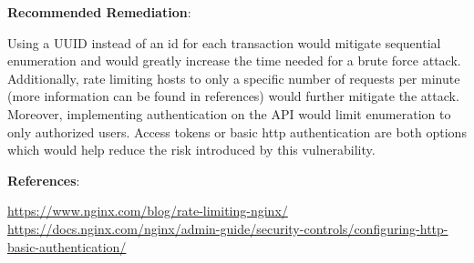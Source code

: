     \noindent
    \textbf{Recommended Remediation}:
    
    Using a UUID instead of an id for each transaction would mitigate sequential enumeration and would greatly increase the time needed for a brute force attack. Additionally, rate limiting hosts to only a specific number of requests per minute (more information can be found in references) would further mitigate the attack. Moreover, implementing authentication on the API would limit enumeration to only authorized users.  Access tokens or basic http authentication are both options which would help reduce the risk introduced by this vulnerability.
    
    \noindent
    \textbf{References}:
    
    \url{https://www.nginx.com/blog/rate-limiting-nginx/}
    \url{https://docs.nginx.com/nginx/admin-guide/security-controls/configuring-http-basic-authentication/}
    
    